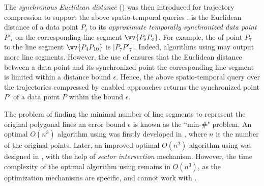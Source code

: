 

	The \emph{synchronous Euclidean distance} (\sed) was then introduced for trajectory compression to support the above spatio-temporal queries \cite{Meratnia:Spatiotemporal}. \sed is the Euclidean distance of a data point $P_i$ to its \emph{approximate temporally synchronized data point $P'_i$} on the corresponding line segment $\vv{P_sP_{e}}$. For example, the \sed of point $P_7$ to the line segment $\vv{P_4P_{10}}$ is $|P_7P'_7|$. 
Indeed, \lsa algorithms using \sed may output more line segments. 
However, the use of \sed ensures that the Euclidean distance between a data point and its synchronized point \wrt the corresponding line segment is limited within a distance bound $\epsilon$. Hence, the above spatio-temporal query over the trajectories compressed by \sed enabled approaches returns the synchronized point $P'$ of a data point $P$ within the bound $\epsilon$.



The problem of finding the minimal number of line segments to represent the original polygonal lines \wrt an error bound $\epsilon$ is known as the ``min-\#" problem\cite{Imai:Optimal,Chan:Optimal}.
An optimal $O(n^3)$  \lsa algorithm using \ped was firstly developed in \cite{Imai:Optimal},  where $n$ is the number of the original points.
	Later, an improved optimal  $O(n^2)$  algorithm using \ped was designed in \cite{Chan:Optimal}, with the help of \textit{sector intersection} mechanism.
	However, the time complexity of the optimal \lsa algorithm using \sed remains in $O(n^3)$, as the optimization mechanisms are \ped specific, and cannot work with \sed.

